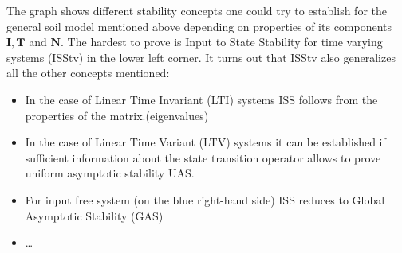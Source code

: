 \begin{minipage}[height=\columnheight]{\textwidth}
\begin{multicols*}{3}
  \columnbreak
  \noindent
  The graph shows different stability concepts one could try to establish for the
  general soil model mentioned above depending on properties of its components 
  $\mathbf{I},\mathbf{T}$ and $ \mathbf{N}$. The hardest to prove is Input to
  State Stability for time varying systems (ISStv) in the lower left corner.  It
  turns out that ISStv also generalizes all the other concepts mentioned:
  \begin{itemize}
  \item 
  In the case of Linear Time Invariant (LTI) systems  ISS follows from the properties of the matrix.(eigenvalues)
  \item 
  In the case of Linear Time Variant (LTV) systems it can be established if sufficient information about the 
  state transition operator allows to prove uniform asymptotic stability UAS.
  \item
  For input free system (on the blue right-hand side) ISS reduces to Global Asymptotic Stability (GAS)
  \item
  \dots
  

\end{itemize}
\end{multicols*}
\end{minipage}

